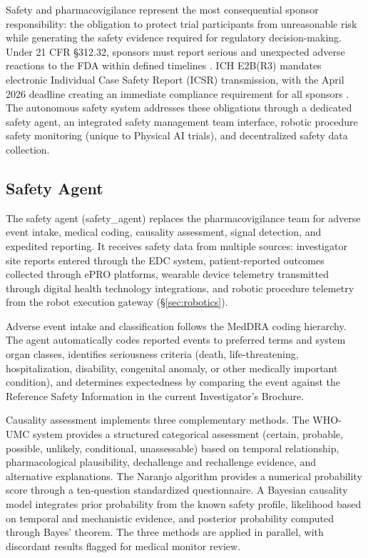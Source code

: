 
Safety and pharmacovigilance represent the most consequential sponsor responsibility: the
obligation to protect trial participants from unreasonable risk while generating the safety
evidence required for regulatory decision-making. Under 21 CFR \S312.32, sponsors must
report serious and unexpected adverse reactions to the FDA within defined timelines
\cite{cfr-part-312}. ICH E2B(R3) mandates electronic Individual Case Safety Report (ICSR)
transmission, with the April 2026 deadline creating an immediate compliance requirement for
all sponsors \cite{ich-e2br3}. The autonomous safety system addresses these obligations
through a dedicated safety agent, an integrated safety management team interface, robotic
procedure safety monitoring (unique to Physical AI trials), and decentralized safety data
collection.

\subsection{Safety Agent}

The safety agent (safety\_agent) replaces the pharmacovigilance team for adverse event
intake, medical coding, causality assessment, signal detection, and expedited reporting. It
receives safety data from multiple sources: investigator site reports entered through the
EDC system, patient-reported outcomes collected through ePRO platforms, wearable device
telemetry transmitted through digital health technology integrations, and robotic procedure
telemetry from the robot execution gateway (\S\ref{sec:robotics}).

Adverse event intake and classification follows the MedDRA coding hierarchy. The agent
automatically codes reported events to preferred terms and system organ classes, identifies
seriousness criteria (death, life-threatening, hospitalization, disability, congenital
anomaly, or other medically important condition), and determines expectedness by comparing
the event against the Reference Safety Information in the current Investigator's Brochure.

Causality assessment implements three complementary methods. The WHO-UMC system provides
a structured categorical assessment (certain, probable, possible, unlikely, conditional,
unassessable) based on temporal relationship, pharmacological plausibility, dechallenge and
rechallenge evidence, and alternative explanations. The Naranjo algorithm provides a
numerical probability score through a ten-question standardized questionnaire. A Bayesian
causality model integrates prior probability from the known safety profile, likelihood
based on temporal and mechanistic evidence, and posterior probability computed through
Bayes' theorem. The three methods are applied in parallel, with discordant results
flagged for medical monitor review.

